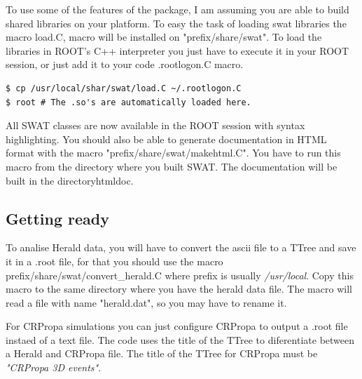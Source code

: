 \documentclass[12pt]{article}
\begin{document}
To use some of the features of the package, I am assuming you are able to build
shared libraries on your platform.  To easy the task of loading swat libraries
the macro load.C, macro will be installed on
{\color{brown}"prefix/share/swat"}. To load the libraries in ROOT's C++
interpreter you just have to execute it in your ROOT session, or just
add it to your code {\color{brown}.rootlogon.C} macro.

{ \color{brown}
\begin{lstlisting}
$ cp /usr/local/shar/swat/load.C ~/.rootlogon.C
$ root # The .so's are automatically loaded here.
\end{lstlisting}
}

All SWAT classes are now available in the ROOT session with syntax
highlighting. You should also be able to generate documentation in HTML format
with the macro {\color{brown}"prefix/share/swat/makehtml.C"}. You have to run
this macro from the directory where you built SWAT. The documentation will be
built in the directory{\color{brown}htmldoc}.

\subsection{Getting ready} \label{ch::ready}
To analise Herald data, you will have to convert the ascii file to a TTree and
save it in a .root file, for that you should use the macro
{\color{brown}prefix/share/swat/convert\_herald.C} where prefix is usually
\textit{/usr/local}.  Copy this macro to the same directory where you have the
herald data file. The macro will read a file with name
{\color{brown}"herald.dat"}, so you may have to rename it. 

For CRPropa simulations you can just configure CRPropa to output a .root file
instaed of a text file.  The code uses the title of the TTree to diferentiate
between a Herald and CRPropa file. The title of the TTree for CRPropa must be
\textit{\color{brown}"CRPropa 3D events"}.
\end{document}
